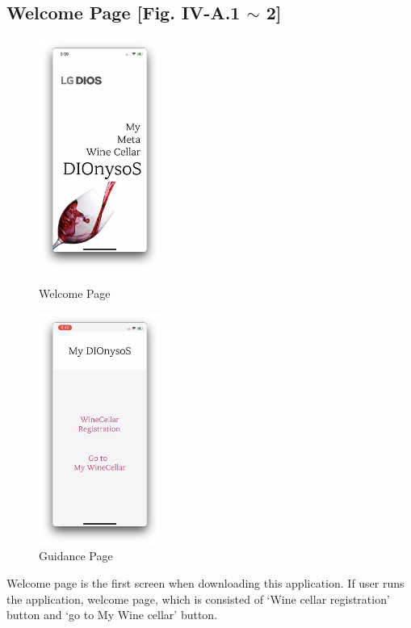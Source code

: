 \documentclass[conference]{IEEEtran}
\numberwithin{figure}{subsection}
\begin{document}
\subsection{Welcome Page [Fig. IV-A.1 $\sim$ 2]}
\begin{figure}[htb!]
    \centerline{\includegraphics[width=4cm]{firstpage.png}}
    \caption{Welcome Page}
    \centerline{\includegraphics[width=4cm]{guidance.png}}
    \caption{Guidance Page}
\end{figure}
Welcome page is the first screen when downloading this application. If user runs the application, welcome page, which is consisted of ‘Wine cellar registration’ button and ‘go to My Wine cellar’ button.
\end{document}
